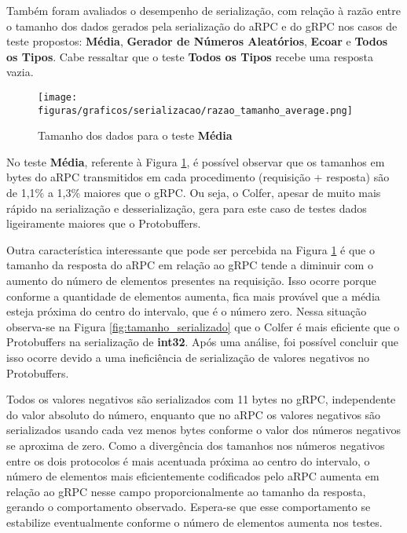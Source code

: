 Também foram avaliados o desempenho de serialização, com relação à razão entre o tamanho dos dados gerados pela serialização do aRPC e do gRPC nos casos de teste propostos:
\textbf{Média}, \textbf{Gerador de Números Aleatórios}, \textbf{Ecoar} e \textbf{Todos os Tipos}. 
Cabe ressaltar que o teste \textbf{Todos os Tipos} recebe uma resposta vazia.

\begin{figure}[ht]
    \centering
    \caption{Tamanho dos dados para o teste \textbf{Média}}
    \texttt{[image: figuras/graficos/serializacao/razao\_tamanho\_average.png]} 
    \label{fig:razao_tamanho_average}
\end{figure}

No teste \textbf{Média}, referente à Figura \ref{fig:razao_tamanho_average}, é possível observar que os tamanhos em bytes do aRPC transmitidos em cada procedimento (requisição + resposta) são de 1,1\% a 1,3\% maiores que o gRPC. Ou seja, o Colfer, apesar de muito mais rápido na serialização e desserialização, gera para este caso de testes dados ligeiramente maiores que o Protobuffers. 

Outra característica interessante que pode ser percebida na Figura \ref{fig:razao_tamanho_average} é que o tamanho da resposta do aRPC em relação ao gRPC tende a diminuir com o aumento do número de elementos presentes na requisição. Isso ocorre porque conforme a quantidade de elementos aumenta, fica mais provável que a média esteja próxima do centro do intervalo, que é o número zero. Nessa situação observa-se na Figura \ref{fig:tamanho_serializado} que o Colfer é mais eficiente que o Protobuffers na serialização de \textbf{int32}. Após uma análise, foi possível concluir que isso ocorre devido a uma ineficiência de serialização de valores negativos no Protobuffers.

Todos os valores negativos são serializados com 11 bytes no gRPC, independente do valor absoluto do número, enquanto que no aRPC os valores negativos são serializados usando cada vez menos bytes conforme o valor dos números negativos se aproxima de zero. Como a divergência dos tamanhos nos números negativos entre os dois protocolos é mais acentuada próxima ao centro do intervalo, o número de elementos mais eficientemente codificados pelo aRPC aumenta em relação ao gRPC nesse campo proporcionalmente ao tamanho da resposta, gerando o comportamento observado. Espera-se que esse comportamento se estabilize eventualmente conforme o número de elementos aumenta nos testes.

